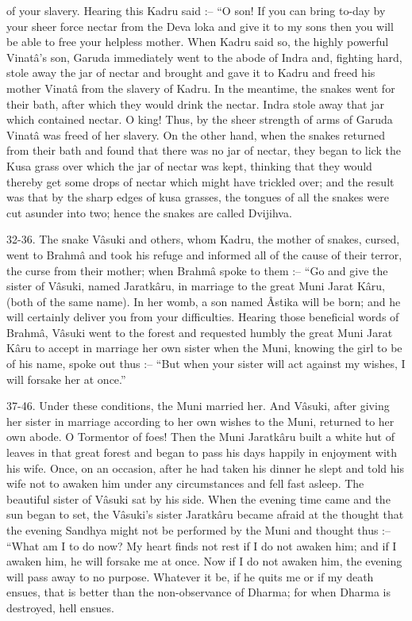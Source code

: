 of your slavery. Hearing this Kadru said :-- ``O son! If you can bring to-day by your sheer force nectar from the Deva loka and give it to my sons then you will be able to free your helpless mother. When Kadru said so, the highly powerful Vinat\^a's son, Garuda immediately went to the abode of Indra and, fighting hard, stole away the jar of nectar and brought and gave it to Kadru and freed his mother Vinat\^a from the slavery of Kadru. In the meantime, the snakes went for their bath, after which they would drink the nectar. Indra stole away that jar which contained nectar. O king! Thus, by the sheer strength of arms of Garuda Vinat\^a was freed of her slavery. On the other hand, when the snakes returned from their bath and found that there was no jar of nectar, they began to lick the Kusa grass over which the jar of nectar was kept, thinking that they would thereby get some drops of nectar which might have trickled over; and the result was that by the sharp edges of kusa grasses, the tongues of all the snakes were cut asunder into two; hence the snakes are called Dvijihva.

32-36. The snake V\^asuki and others, whom Kadru, the mother of snakes, cursed, went to Brahm\^a and took his refuge and informed all of the cause of their terror, the curse from their mother; when Brahm\^a spoke to them :-- ``Go and give the sister of V\^asuki, named Jaratk\^aru, in marriage to the great Muni Jarat K\^aru, (both of the same name). In her womb, a son named \^Astika will be born; and he will certainly deliver you from your difficulties. Hearing those beneficial words of Brahm\^a, V\^asuki went to the forest and requested humbly the great Muni Jarat K\^aru to accept in marriage her own sister when the Muni, knowing the girl to be of his name, spoke out thus :-- ``But when your sister will act against my wishes, I will forsake her at once.''

37-46. Under these conditions, the Muni married her. And V\^asuki, after giving her sister in marriage according to her own wishes to the Muni, returned to her own abode. O Tormentor of foes! Then the Muni Jaratk\^aru built a white hut of leaves in that great forest and began to pass his days happily in enjoyment with his wife. Once, on an occasion, after he had taken his dinner he slept and told his wife not to awaken him under any circumstances and fell fast asleep. The beautiful sister of V\^asuki sat by his side. When the evening time came and the sun began to set, the V\^asuki's sister Jaratk\^aru became afraid at the thought that the evening Sandhya might not be performed by the Muni and thought thus :-- ``What am I to do now? My heart finds not rest if I do not awaken him; and if I awaken him, he will forsake me at once. Now if I do not awaken him, the evening will pass away to no purpose. Whatever it be, if he quits me or if my death ensues, that is better than the non-observance of Dharma; for when Dharma is destroyed, hell ensues.

